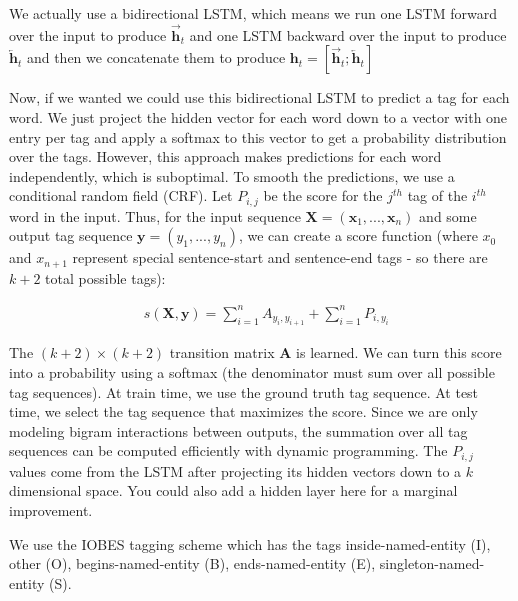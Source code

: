 \documentclass[a4paper]{article}
\begin{document}
We actually use a bidirectional LSTM, which means we run one LSTM forward
over the input to produce $\overrightarrow{\mathbf{h}}_t$ and one LSTM
backward over the input to produce $\overleftarrow{\mathbf{h}}_t$ and then
we concatenate them to produce $\mathbf{h}_t =
[\overrightarrow{\mathbf{h}}_t; \overleftarrow{\mathbf{h}}_t]$

Now, if we wanted we could use this bidirectional LSTM to predict a tag
for each word. We just project the hidden vector for each word down to
a vector with one entry per tag and apply a softmax to this vector to get
a probability distribution over the tags. However, this approach makes
predictions for each word independently, which is suboptimal. To smooth
the predictions, we use a conditional random field (CRF). Let $P_{i, j}$ be
the score for the $j^{th}$ tag of the $i^{th}$ word in the input. Thus,
for the input sequence $\mathbf{X} = (\mathbf{x}_1, ..., \mathbf{x}_n)$
and some output tag sequence $\mathbf{y} = (y_1, ..., y_n)$, we can create
a score function (where $x_0$ and $x_{n+1}$ represent special sentence-start
and sentence-end tags - so there are $k + 2$ total possible tags):

\begin{align}
  & s(\mathbf{X}, \mathbf{y}) = \sum_{i=1}^{n}{A_{y_i, y_{i+1}}} +
  \sum_{i=1}^{n}{P_{i, y_i}}
\end{align}

The $(k + 2) \times (k + 2)$ transition matrix $\mathbf{A}$ is learned. We
can turn this score into a probability using a softmax (the denominator
must sum over all possible tag sequences). At train time, we use the
ground truth tag sequence. At test time, we select the tag sequence that
maximizes the score. Since we are only modeling bigram interactions between
outputs, the summation over all tag sequences can be computed efficiently
with dynamic programming. The $P_{i, j}$ values come from the LSTM after
projecting its hidden vectors down to a $k$ dimensional space. You could
also add a hidden layer here for a marginal improvement.

We use the IOBES tagging scheme which has the tags inside-named-entity (I),
other (O), begins-named-entity (B), ends-named-entity (E), 
singleton-named-entity (S).
\end{document}
